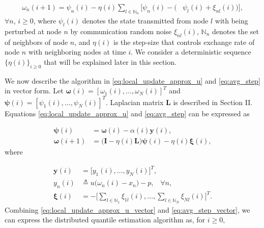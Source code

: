 \documentclass[journal]{IEEEtran}
\begin{document}
\vspace{-4mm}
\small
\begin{align}
\omega_n(i+1) = \psi_n(i) - \eta(i) \sum_{l \in \mathbb{N}_n} \Big[\psi_n(i) - \big(&\psi_l(i) + \xi_{nl}(i)\big) \Big], \label{eq:avg_step}
\end{align}
\normalsize
$\forall n$, $i \ge 0$, where $\psi_l(i)$ denotes the state transmitted from node $l$ with being perturbed at node $n$ by communication random noise $\xi_{nl}(i)$,  $\mathbb{N}_n$ denotes the set of neighbors of node $n$, and $\eta(i)$ is the step-size that controls exchange rate of node $n$ with neighboring nodes at time $i$. We consider a deterministic sequence $\{\eta(i)\}_{i\ge0}$ that will be explained later in this section. 

We now describe the algorithm in \eqref{eq:local_update_approx_u} and \eqref{eq:avg_step} in vector form. Let $\bm{\omega}(i) = \left[\omega_1(i),\ldots,\omega_N(i)\right]^T$ and $\bm{\psi}(i) = \left[\psi_1(i),\ldots,\psi_N(i)\right]^T$. Laplacian matrix $\mathbf{L}$ is described in Section II. Equations \eqref{eq:local_update_approx_u} and \eqref{eq:avg_step} can be {}{expressed} as

\vspace{-4mm}
\small
\begin{align}
\bm{\psi}(i) &= \bm{\omega}(i) - \alpha(i) \mathbf{y}(i), \label{eq:local_update_approx_u_vector} \\
\bm{\omega}(i+1) &= \big(\mathbf{I} - \eta(i) \mathbf{L}\big) \bm{\psi}(i) - \eta(i) \bm{\xi}(i), \label{eq:avg_step_vector}
\end{align}
\normalsize
where

\vspace{-4mm}
\small
\begin{align}
\mathbf{y}(i)&=\big[y_1(i),\ldots,y_N(i)\big]^T, \\
y_n(i) &\triangleq u\big(\omega_n(i) - x_n\big) - p,\,\,\,\,\,\forall n, \label{eq:y_n(i)} \\
\bm{\xi} (i) &= - \Bigg[\sum\limits_{l \in \mathbb{N}_1} \xi_{1l}(i), \ldots, \sum\limits_{l \in \mathbb{N}_N} \xi_{Nl}(i)\Bigg]^T. \label{eq:xi(i)}
\end{align}
\normalsize
Combining \eqref{eq:local_update_approx_u_vector} and \eqref{eq:avg_step_vector}, we can express the distributed quantile estimation algorithm as, for $i \ge 0$,
\end{document}
